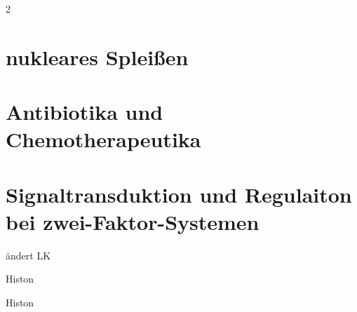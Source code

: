 \documentclass{article}
\begin{document}
\begin{multicols}{2}
\section{nukleares Spleißen}

\section{Antibiotika und Chemotherapeutika}

\section{Signaltransduktion und Regulaiton bei zwei-Faktor-Systemen}
\begin{infobox}[title=Topoisomerase]
ändert LK
\end{infobox}
\begin{infobox}[title=Oktamerprotein]
Histon
\end{infobox}
\begin{infobox}[title=philosoph]
Histon
\end{infobox}




\end{multicols}
\end{document}
